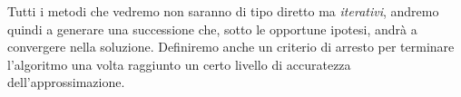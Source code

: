 Tutti i metodi che vedremo non saranno di tipo diretto ma \emph{iterativi}, andremo quindi a generare una
successione che, sotto le opportune ipotesi, andrà a convergere nella soluzione. Definiremo anche un criterio
di arresto per terminare l'algoritmo una volta raggiunto un certo livello di accuratezza dell'approssimazione.